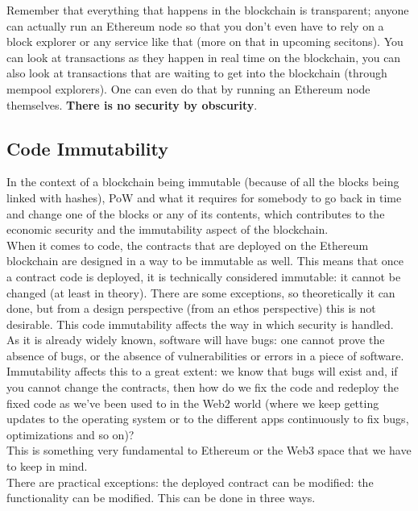 Remember that everything that happens in the blockchain is transparent; anyone can actually run an Ethereum node so that you don't even have to rely on a block explorer or any service like that (more on that in upcoming secitons).
You can look at transactions as they happen in real time on the blockchain, you can also look at transactions that are waiting to get into the blockchain (through mempool explorers).
One can even do that by running an Ethereum node themselves. 
\textbf{There is no security by obscurity}.

\subsection*{Code Immutability}

In the context of a blockchain being immutable (because of all the blocks being linked with hashes), PoW and what it requires for somebody to go back in time and change one of the blocks or any of its contents, which contributes to the economic security and the immutability aspect of the blockchain.\\

When it comes to code, the contracts that are deployed on the Ethereum blockchain are designed in a way to be immutable as well.
This means that once a contract code is deployed, it is technically considered immutable: it cannot be changed (at least in theory).
There are some exceptions, so theoretically it can done, but from a design perspective (from an ethos perspective) this is not desirable.
This code immutability affects the way in which security is handled.\\

As it is already widely known, software will have bugs: one cannot prove the absence of bugs, or the absence of vulnerabilities or errors in a piece of software.
Immutability affects this to a great extent: we know that bugs will exist and, if you cannot change the contracts, then how do we fix the code and redeploy the fixed code as we've been used to in the Web2 world (where we keep getting updates to the operating system or to the different apps continuously to fix bugs, optimizations and so on)?\\

This is something very fundamental to Ethereum or the Web3 space that we have to keep in mind.\\

There are practical exceptions: the deployed contract can be modified: the functionality can be modified.
This can be done in three ways.

